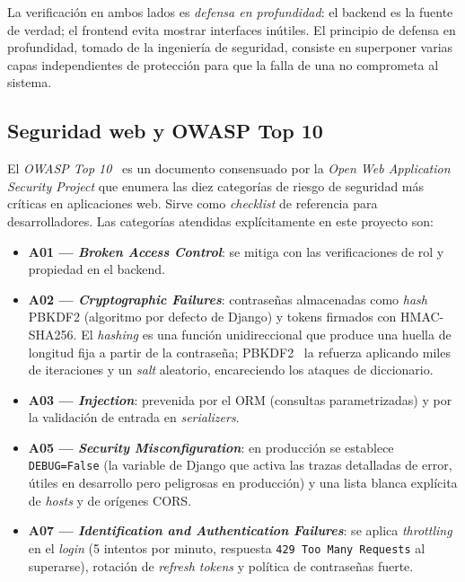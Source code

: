 La verificación en ambos lados es \emph{defensa en profundidad}: el backend es la fuente de verdad; el frontend evita mostrar interfaces inútiles. El principio de defensa en profundidad, tomado de la ingeniería de seguridad, consiste en superponer varias capas independientes de protección para que la falla de una no comprometa al sistema.

\subsection{Seguridad web y OWASP Top 10}

El \emph{OWASP Top 10}~\cite{owasp2021} es un documento consensuado por la \emph{Open Web Application Security Project} que enumera las diez categorías de riesgo de seguridad más críticas en aplicaciones web. Sirve como \emph{checklist} de referencia para desarrolladores. Las categorías atendidas explícitamente en este proyecto son:

\begin{itemize}
    \item \textbf{A01 --- \emph{Broken Access Control}}: se mitiga con las verificaciones de rol y propiedad en el backend.
    \item \textbf{A02 --- \emph{Cryptographic Failures}}: contraseñas almacenadas como \emph{hash} PBKDF2 (algoritmo por defecto de Django) y tokens firmados con HMAC-SHA256. El \emph{hashing} es una función unidireccional que produce una huella de longitud fija a partir de la contraseña; PBKDF2~\cite{rfc8018} la refuerza aplicando miles de iteraciones y un \emph{salt} aleatorio, encareciendo los ataques de diccionario.
    \item \textbf{A03 --- \emph{Injection}}: prevenida por el ORM (consultas parametrizadas) y por la validación de entrada en \emph{serializers}.
    \item \textbf{A05 --- \emph{Security Misconfiguration}}: en producción se establece \texttt{DEBUG=False} (la variable de Django que activa las trazas detalladas de error, útiles en desarrollo pero peligrosas en producción) y una lista blanca explícita de \emph{hosts} y de orígenes CORS.
    \item \textbf{A07 --- \emph{Identification and Authentication Failures}}: se aplica \emph{throttling} en el \emph{login} (5 intentos por minuto, respuesta \texttt{429 Too Many Requests} al superarse), rotación de \emph{refresh tokens} y política de contraseñas fuerte.
\end{itemize}

